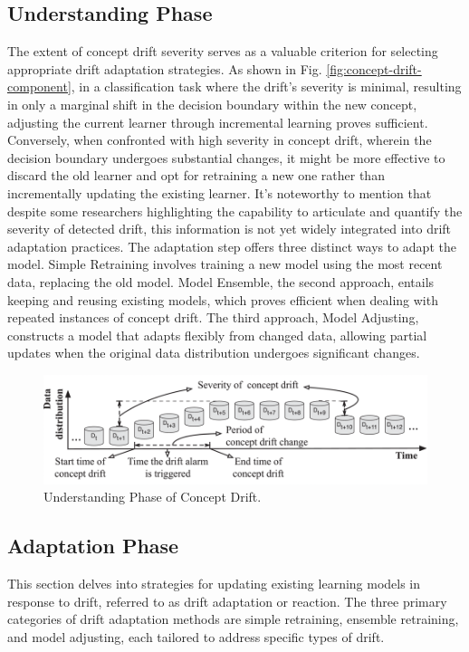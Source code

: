 \subsection{Understanding Phase}
The extent of concept drift severity serves as a valuable criterion for selecting appropriate drift adaptation strategies. As shown in Fig. \ref{fig:concept-drift-component}, in a classification task where the drift's severity is minimal, resulting in only a marginal shift in the decision boundary within the new concept, adjusting the current learner through incremental learning proves sufficient. Conversely, when confronted with high severity in concept drift, wherein the decision boundary undergoes substantial changes, it might be more effective to discard the old learner and opt for retraining a new one rather than incrementally updating the existing learner. It's noteworthy to mention that despite some researchers highlighting the capability to articulate and quantify the severity of detected drift, this information is not yet widely integrated into drift adaptation practices.
The adaptation step offers three distinct ways to adapt the model. Simple Retraining involves training a new model using the most recent data, replacing the old model. Model Ensemble, the second approach, entails keeping and reusing existing models, which proves efficient when dealing with repeated instances of concept drift. The third approach, Model Adjusting, constructs a model that adapts flexibly from changed data, allowing partial updates when the original data distribution undergoes significant changes.

\begin{figure}[!ht]
    \centering
    \includegraphics[width=.9\textwidth]{2_Background/figures/concept_drift_understanding.png}
    \caption{Understanding Phase of Concept Drift.}
    \label{fig:concept-drift-components}
\end{figure}

\subsection{Adaptation Phase}
This section delves into strategies for updating existing learning models in response to drift, referred to as drift adaptation or reaction. The three primary categories of drift adaptation methods are simple retraining, ensemble retraining, and model adjusting, each tailored to address specific types of drift.

